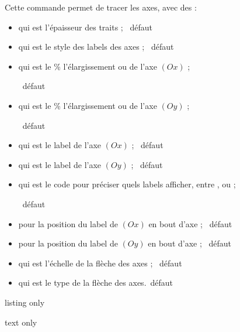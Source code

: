 \begin{cautionblock}
Cette commande permet de tracer les axes, avec des  :

\begin{itemize}
\item {} qui est l'épaisseur des traits ; \hfill~défaut \Cle{1.25pt}
\item {} qui est le style des labels des axes  ; \hfill~défaut 
\item {}  qui est le \% l'élargissement  ou  de l'axe $(Ox)$ ;

\hfill~défaut 
\item {}  qui est le \% l'élargissement  ou  de l'axe $(Oy)$ ;

\hfill~défaut 
\item {} qui est le label de l'axe $(Ox)$ ; \hfill~défaut 
\item {} qui est le label de l'axe $(Oy)$ ; \hfill~défaut 
\item {} qui est le code pour préciser quels labels afficher, entre ,  ou  ;

\hfill~défaut 
\item {} pour la position du label de $(Ox)$ en bout d'axe ; \hfill~défaut 
\item {} pour la position du label de $(Oy)$ en bout d'axe ; \hfill~défaut 
\item {} qui est l'échelle de la flèche des axes ; \hfill~défaut 
\item {} qui est le type de la flèche des axes.\hfill~défaut 
\end{itemize}
\vspace*{-\baselineskip}\leavevmode
\end{cautionblock}

\begin{PresCodeTexPL}{listing only}
\AxesTikz

\AxesTikz%
	[AffLabel=xy,Labelx={Année},Labely={Altitude},%
	PosLabelx={below right},PosLabely={above left},%
	Police=\small\sffamily]
\end{PresCodeTexPL}

\begin{PresCodeSortiePL}{text only}
\hfill~
\begin{tikzpicture}%
[x=0.3cm,y=0.06cm,%
Ox=1992,xmin=1992,xmax=2012,xgrille=2,xgrilles=1,%
Oy=1640,ymin=1640,ymax=1730,ygrille=10,ygrilles=5]
\AxesTikz
\end{tikzpicture}
~~
\begin{tikzpicture}%
[x=0.3cm,y=0.06cm,%
Ox=1992,xmin=1992,xmax=2012,xgrille=2,xgrilles=1,%
Oy=1640,ymin=1640,ymax=1730,ygrille=10,ygrilles=5]
\AxesTikz%
	[AffLabel=xy,Labelx={Année},Labely={Altitude},%
	PosLabelx={below right},PosLabely={above left},%
	Police=\small\sffamily]
\end{tikzpicture}
\hfill~
\end{PresCodeSortiePL}

